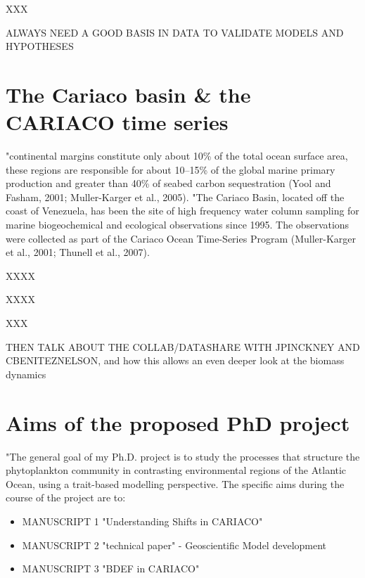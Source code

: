 XXX

ALWAYS NEED A GOOD BASIS IN DATA TO VALIDATE MODELS AND HYPOTHESES

\section{The Cariaco basin \& the CARIACO time series}

"continental margins constitute only about 10\% of the total ocean surface area, these regions are responsible for about 10–15\% of the global marine primary production and greater than 40\% of seabed carbon sequestration (Yool and Fasham, 2001; Muller-Karger et al., 2005). 
"The Cariaco Basin, located off the coast of Venezuela, has been the site of high frequency water column sampling for marine biogeochemical and ecological observations since 1995. The observations were collected as part of the Cariaco Ocean Time-Series Program (Muller-Karger et al., 2001; Thunell et al., 2007). 

XXXX

XXXX

XXX

THEN TALK ABOUT THE COLLAB/DATASHARE WITH JPINCKNEY AND CBENITEZNELSON, and how this allows an even deeper look at the biomass dynamics


\section{Aims of the proposed PhD project}
"The general goal of my Ph.D. project is to study the processes that structure the phytoplankton community in contrasting environmental regions of the Atlantic Ocean, using a trait-based modelling perspective. The specific aims during the course of the project are to:

\begin{itemize}
\item MANUSCRIPT 1 "Understanding Shifts in CARIACO"
\item MANUSCRIPT 2 "technical paper" - Geoscientific Model development
\item MANUSCRIPT 3 "BDEF in CARIACO"
\end{itemize}
